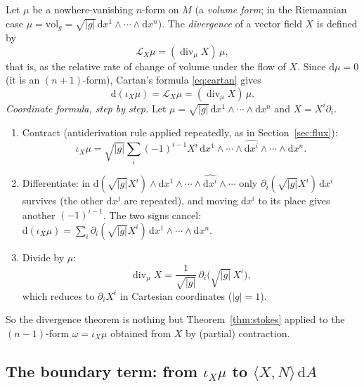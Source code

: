 \documentclass[11pt,a4paper]{article}
\newcounter{thm}[section]
\numberwithin{equation}{section}
\theoremstyle{definition}
\theoremstyle{plain}
\newcommand{\dd}{\mathrm{d}}
\newcommand{\vol}{\mathrm{vol}}
\newcommand{\Lie}{\mathcal{L}}
\begin{document}
Let $\mu$ be a nowhere-vanishing $n$-form on $M$ (a \emph{volume form}; in the Riemannian case $\mu=\vol_g=\sqrt{|g|}\,\dd x^1\wedge\cdots\wedge\dd x^n$). The \emph{divergence} of a vector field $X$ is defined by
\begin{equation}\label{eq:Lmu}
\Lie_X\mu=(\operatorname{div}_\mu X)\,\mu,
\end{equation}
that is, as the relative rate of change of volume under the flow of $X$. Since $\dd\mu=0$ (it is an $(n+1)$-form), Cartan's formula \eqref{eq:cartan} gives
\begin{equation}\label{eq:divmu}
\dd(\iota_X\mu)=\Lie_X\mu=(\operatorname{div}_\mu X)\,\mu .
\end{equation}
\emph{Coordinate formula, step by step.} Let $\mu=\sqrt{|g|}\,\dd x^1\wedge\cdots\wedge\dd x^n$ and $X=X^i\partial_i$.
\begin{enumerate}
\item Contract (antiderivation rule applied repeatedly, as in Section~\ref{sec:flux}): \[\iota_X\mu=\sqrt{|g|}\sum_i(-1)^{i-1}X^i\,\dd x^1\wedge\cdots\wedge\widehat{\dd x^i}\wedge\cdots\wedge\dd x^n.\]
\item Differentiate: in $\dd(\sqrt{|g|}X^i)\wedge\dd x^1\wedge\cdots\wedge\widehat{\dd x^i}\wedge\cdots$ only $\partial_i(\sqrt{|g|}X^i)\,\dd x^i$ survives (the other $\dd x^j$ are repeated), and moving $\dd x^i$ to its place gives another $(-1)^{i-1}$. The two signs cancel: $\dd(\iota_X\mu)=\sum_i\partial_i(\sqrt{|g|}X^i)\,\dd x^1\wedge\cdots\wedge\dd x^n$.
\item Divide by $\mu$:
\begin{equation}\label{eq:divcoord}
\operatorname{div}_\mu X=\frac1{\sqrt{|g|}}\,\partial_i\bigl(\sqrt{|g|}\,X^i\bigr),
\end{equation}
which reduces to $\partial_iX^i$ in Cartesian coordinates ($|g|=1$).
\end{enumerate}
So the divergence theorem is nothing but Theorem~\ref{thm:stokes} applied to the $(n-1)$-form $\omega=\iota_X\mu$ obtained from $X$ by (partial) contraction.

\subsection{The boundary term: from $\iota_X\mu$ to $\langle X,N\rangle\,\dd A$}\label{sec:boundaryterm}
\end{document}
